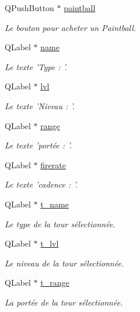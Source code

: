 \begin{DoxyCompactItemize}
QPushButton $\ast$ \hyperlink{classUI_a39fd06f53449fb6382de26d280be2e5f}{paintball}
\begin{DoxyCompactList}\small\item\em Le bouton pour acheter un Paintball. \end{DoxyCompactList}\item 
QLabel $\ast$ \hyperlink{classUI_a81ae571ef0c2c3044c1a5271887f5936}{name}
\begin{DoxyCompactList}\small\item\em Le texte 'Type : '. \end{DoxyCompactList}\item 
QLabel $\ast$ \hyperlink{classUI_a92e0870069d6ca6cd8b6dba91ec3702d}{lvl}
\begin{DoxyCompactList}\small\item\em Le texte 'Niveau : '. \end{DoxyCompactList}\item 
QLabel $\ast$ \hyperlink{classUI_aacb7c02b6a962b8adc8a7d4b6ffc1553}{range}
\begin{DoxyCompactList}\small\item\em Le texte 'portée : '. \end{DoxyCompactList}\item 
QLabel $\ast$ \hyperlink{classUI_a58bde2e8f6ca9d8f2fa32affefa02045}{firerate}
\begin{DoxyCompactList}\small\item\em Le texte 'cadence : '. \end{DoxyCompactList}\item 
QLabel $\ast$ \hyperlink{classUI_a161fc86882aacdd0577fc8e65ae7b9a5}{t\_\-name}
\begin{DoxyCompactList}\small\item\em Le type de la tour sélectionnée. \end{DoxyCompactList}\item 
QLabel $\ast$ \hyperlink{classUI_ad249255ec54bc26253e0c215852a8eac}{t\_\-lvl}
\begin{DoxyCompactList}\small\item\em Le niveau de la tour sélectionnée. \end{DoxyCompactList}\item 
QLabel $\ast$ \hyperlink{classUI_a46e8137a64e79962e0ba633d4feb341f}{t\_\-range}
\begin{DoxyCompactList}\small\item\em La portée de la tour sélectionnée. \end{DoxyCompactList}\item 

\end{DoxyCompactItemize}
